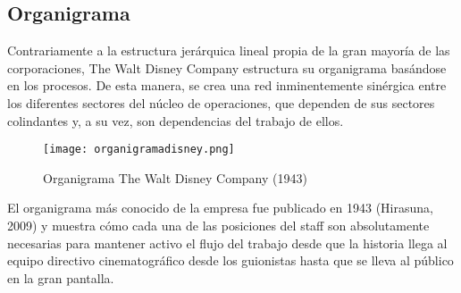 \subsection{Organigrama}

Contrariamente a la estructura jerárquica lineal propia de la gran mayoría de las corporaciones, The Walt Disney Company estructura su organigrama basándose en los procesos. De esta manera, se crea una red inminentemente sinérgica entre los diferentes sectores del núcleo de operaciones, que dependen de sus sectores colindantes y, a su vez, son dependencias del trabajo de ellos.

\begin{figure}[!htb]
	\centering
		\texttt{[image: organigramadisney.png]}
		\caption{\label{fig:frog}Organigrama The Walt Disney Company (1943)}
\end{figure}

El organigrama más conocido de la empresa fue publicado en 1943 (Hirasuna, 2009) y muestra cómo cada una de las posiciones del staff son absolutamente necesarias para mantener activo el flujo del trabajo desde que la historia llega al equipo directivo cinematográfico desde los guionistas hasta que se lleva al público en la gran pantalla.